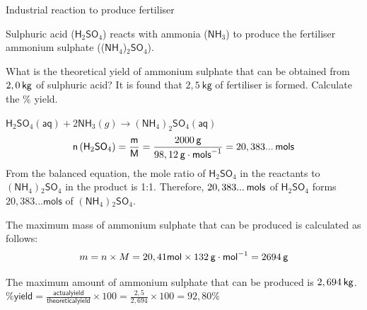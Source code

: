  \par \label{m38712*secfhsst!!!underscore!!!id2067}\vspace{.5cm} 
      \noindent 
      \begin{wex}{Industrial reaction to produce fertiliser }
{
\label{m38712*probfhsst!!!underscore!!!id2068}
      \label{m38712*id284606}Sulphuric acid ($\mathsf{H}{}_{2}\mathsf{SO}{}_{4}$) reacts with ammonia ($\mathsf{NH}{}_{3}$) to produce the fertiliser ammonium sulphate (($\mathsf{NH}{}_{4}$)${}_{2}\mathsf{SO}{}_{4}$).
      \par 
      \label{m38712*id284791}What is the theoretical yield of ammonium sulphate that can be obtained from $2,0\phantom{\rule{2pt}{0ex}}\mathsf{kg}$ of sulphuric acid? It is found that $2,5 ~\mathsf{kg}$ of fertiliser is formed. Calculate the \% yield.
 \par 
      \vspace{5pt} }
{
      \label{m38712*id284813}\nopagebreak\noindent{}
\label{m38712*id284690}${\mathsf{H}}_{2}{\mathsf{SO}}_{4}\left(\mathsf{aq}\right)+2{\mathsf{NH}}_{3}\left(g\right)\to {\left({\mathsf{NH}}_{4}\right)}_{2}{\mathsf{SO}}_{4}\left(\mathsf{aq}\right)$
    \begin{equation*}
    \mathsf{n}\left({\mathsf{H}}_{2}{\mathsf{SO}}_{4}\right)=\frac{\mathsf{m}}{\mathsf{M}}=\frac{2 000\phantom{\rule{2pt}{0ex}}\mathsf{g}}{98,12\phantom{\rule{2pt}{0ex}}\mathsf{g}\ensuremath{\cdot}{\mathsf{mols}}^{-1}}=20,383...\phantom{\rule{2pt}{0ex}}\mathsf{mols}
      \end{equation*}
      \label{m38712*id285156}From the balanced equation, the mole ratio of $\mathsf{H}{}_{2}\mathsf{SO}{}_{4}$ in the reactants to $\left(\mathsf{NH}{}_{4}\right){}_{2}\mathsf{SO}{}_{4}$ in the product is 1:1. Therefore, $20,383...\phantom{\rule{2pt}{0ex}}\mathsf{mols}$ of $\mathsf{H}{}_{2}\mathsf{SO}{}_{4}$ forms $20,383... \mathsf{mols}$ of $\left(\mathsf{NH}{}_{4}\right){}_{2}\mathsf{SO}{}_{4}$.\par 
{}
      \label{m38712*id285290}The maximum mass of ammonium sulphate that can be produced is calculated as follows:
      \label{m38712*id285296}\nopagebreak\noindent{}
    \begin{equation*}
    m=n\ensuremath{\times}M=20,41\mathsf{mol}\ensuremath{\times}132\phantom{\rule{2pt}{0ex}}\mathsf{g}\ensuremath{\cdot}{\mathsf{mol}}^{-1}=2694\phantom{\rule{2pt}{0ex}}\mathsf{g}
      \end{equation*}
      \par 
      \label{m38712*id285362}The maximum amount of ammonium sulphate that can be produced is $2,694\phantom{\rule{2pt}{0ex}}\mathsf{kg}$.
 $\mathsf{\% yield} = \frac{\mathsf{actual yield}}{\mathsf{theoretical yield}} \times 100 = \frac{2,5}{2,694} \times 100 = 92,80 \%$
}
    \end{wex}
